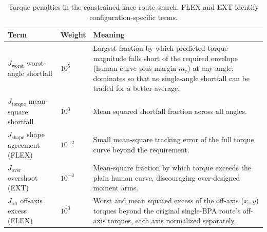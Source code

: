 \begin{table}[htbp]
\caption{Torque penalties in the constrained knee-route search. FLEX and EXT identify configuration-specific terms.}\label{tab:mesh_penalties}
\small\singlespacing
\begin{tabularx}{\textwidth}{@{}>{\raggedright\arraybackslash}p{}p{}>{\raggedright\arraybackslash}X@{}}
\toprule
\textbf{Term} & \textbf{Weight} & \textbf{Meaning} \\
\midrule
$J_{\text{worst}}$ worst-angle shortfall & $10^{5}$ & Largest fraction by which predicted torque magnitude falls short of the required envelope (human curve plus margin $m_{r}$) at any angle; dominates so that no single-angle shortfall can be traded for a better average. \\
$J_{\text{torque}}$ mean-square shortfall & $10^{3}$ & Mean squared shortfall fraction across all angles. \\
$J_{\text{shape}}$ shape agreement (FLEX) & $10^{-2}$ & Small mean-square tracking error of the full torque curve beyond the requirement. \\
$J_{\text{over}}$ overshoot (EXT) & $10^{-3}$ & Mean-square fraction by which torque exceeds the plain human curve, discouraging over-designed moment arms. \\
$J_{\text{off}}$ off-axis excess (FLEX) & $10^{3}$ & Worst and mean squared excess of the off-axis ($x$, $y$) torques beyond the original single-BPA route's off-axis torques, each axis normalized separately. \\
\bottomrule
\end{tabularx}
\end{table}

